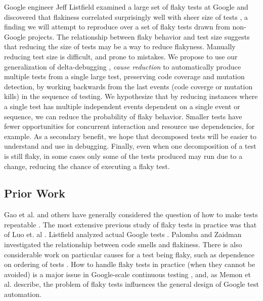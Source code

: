 \documentclass[10pt]{article}
\begin{document}
  Google engineer Jeff Listfield examined a large set of flaky tests at Google and discovered that flakiness correlated surprisingly well with sheer size of tests \cite{listfieldtestanalysis}, a finding we will attempt to reproduce over a set of flaky tests drawn from non-Google projects.  The relationship between flaky behavior and test size suggests that reducing the size of tests may be a way to reduce flakyness.  Manually reducing test size is difficult, and prone to mistakes.  We propose to use our generalization of delta-debugging \cite{DD}, \emph{cause reduction} \cite{stvrcausereduce} to automatically produce multiple tests from a single large test, preserving code coverage and mutation detection, by working backwards from the last events (code coverge or mutation kills) in the sequence of testing.  We hypothesize that by reducing instances where a single test has multiple independent events dependent on a single event or sequence, we can reduce the probability of flaky behavior.  Smaller tests have fewer opportunities for concurrent interaction and resource use dependencies, for example.  As a secondary benefit, we hope that decomposed tests will be easier to understand and use in debugging.  Finally, even when one decomposition of a test is still flaky, in some cases only some of the tests produced may run due to a change, reducing the chance of executing a flaky test.


\subsection{Prior Work}


Gao et al. and others have generally considered the question of how to make tests repeatable \cite{Gao:2015:MSU:2818754.2818764}.  
The most extensive previous study of flaky tests in practice was that of Luo et. al \cite{luo2014empirical}.  Listfield analyzed actual Google tests \cite{listfieldtestanalysis}. Palomba and Zaidman \cite{palomba2017does} investigated the relationship between code smells and flakiness.  There is also considerable work on particular causes for a test being flaky, such as dependence on ordering of tests \cite{LamZE2015}.  How to handle flaky tests in practice (when they cannot be avoided) is a major issue in Google-scale continuous testing \cite{memon2017taming}, and, as Memon et al. describe, the problem of flaky tests influences the general design of Google test automation.



\end{document}
